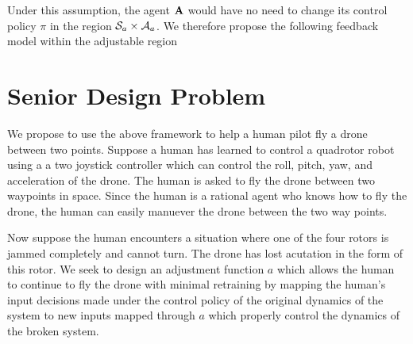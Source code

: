 \documentclass[a4paper,10pt]{article}
\begin{document}
Under this assumption, the agent $\mathbf{A}$ would have no need to change its control policy $\pi$ in the region $\mathcal{S}_a \times \mathcal{A}_a$. We therefore propose the following feedback model within the adjustable region
\begin{figure}[H]
 \begin{center}
 \end{center}
\end{figure}

\section{Senior Design Problem}

We propose to use the above framework to help a human pilot fly a drone between two points. Suppose a human has learned to control a quadrotor robot using a a two joystick controller which can control the roll, pitch, yaw, and acceleration of the drone. The human is asked to fly the drone between two waypoints in space. Since the human is a rational agent who knows how to fly the drone, the human can easily manuever the drone between the two way points.

Now suppose the human encounters a situation where one of the four rotors is jammed completely and cannot turn. The drone has lost acutation in the form of this rotor. We seek to design an adjustment function $a$ which allows the human to continue to fly the drone with minimal retraining by mapping the human's input decisions made under the control policy of the original dynamics of the system to new inputs mapped through $a$ which properly control the dynamics of the broken system.








 

\end{document}
